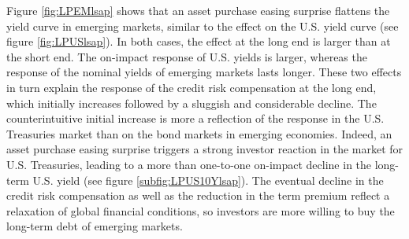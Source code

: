 {Figure \ref{fig:LPEMlsap} shows that an asset purchase easing surprise flattens the yield curve in emerging markets, similar to the effect on the U.S. yield curve (see figure \ref{fig:LPUSlsap}). %
In both cases, the effect at the long end %
is larger than at the short end.
The on-impact response of U.S. yields is larger, whereas the response of the nominal yields of emerging markets lasts longer.
These two effects in turn explain the response of the credit risk compensation at the long end, which %
initially increases followed by a sluggish and considerable decline.
The counterintuitive initial increase %
is more a reflection of the response in the U.S. Treasuries market than on the bond markets in emerging economies.
Indeed, an asset purchase easing surprise triggers a strong investor reaction in the market for U.S. Treasuries, leading to a  more than one-to-one on-impact decline in the long-term U.S. yield (see figure \ref{subfig:LPUS10Ylsap}).
The eventual decline in the credit risk compensation as well as the reduction in the term premium reflect a relaxation of global financial conditions, so investors are more willing to buy the long-term debt of emerging markets. 


}
